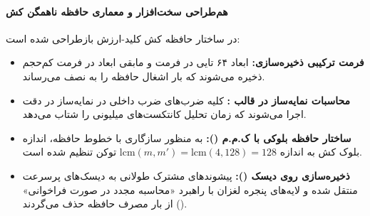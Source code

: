 \paragraph*{هم‌طراحی سخت‌افزار و معماری حافظه ناهمگن کش}
در  ساختار حافظه کش کلید-ارزش بازطراحی شده است:
\begin{itemize}
    \item \textbf{فرمت ترکیبی ذخیره‌سازی:} ابعاد ۶۴ تایی  در فرمت  و مابقی ابعاد در فرمت کم‌حجم  ذخیره می‌شوند که بار اشغال حافظه را به نصف می‌رساند.
    \item \textbf{محاسبات نمایه‌ساز در قالب :} کلیه ضرب‌های ضرب داخلی در نمایه‌ساز در دقت  اجرا می‌شوند که زمان تحلیل کانتکست‌های میلیونی را شتاب می‌دهد.
    \item \textbf{ساختار حافظه بلوکی با ک.م.م ():} به منظور سازگاری با خطوط حافظه، اندازه بلوک کش به اندازه $\text{lcm}(m, m') = \text{lcm}(4, 128) = 128$ توکن تنظیم شده است.
    \item \textbf{ذخیره‌سازی روی دیسک ():} پیشوندهای مشترک طولانی به دیسک‌های پرسرعت  منتقل شده و لایه‌های پنجره لغزان با راهبرد «محاسبه مجدد در صورت فراخوانی» () از بار مصرف حافظه حذف می‌گردند.
\end{itemize}